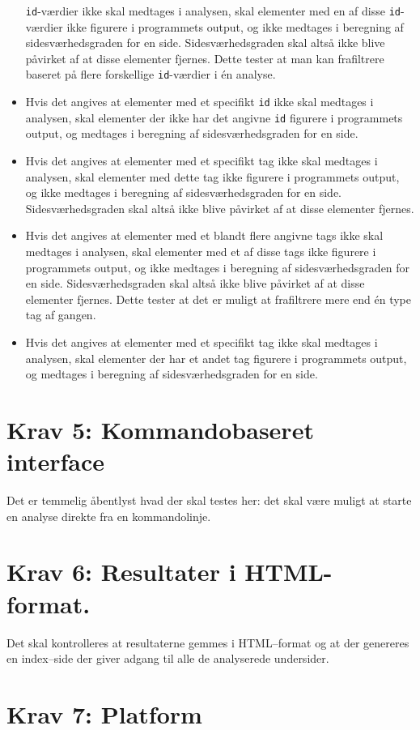 \documentclass[a4paper,oneside,article]{memoir}
\begin{document}
\begin{landscape}
\begin{itemize}
  \texttt{id}-værdier ikke skal medtages i analysen, skal elementer
  med en af disse \texttt{id}-værdier ikke figurere i programmets
  output, og ikke medtages i beregning af sidesværhedsgraden for en
  side. Sidesværhedsgraden skal altså ikke blive påvirket af at disse
  elementer fjernes. Dette tester at man kan frafiltrere baseret på
  flere forskellige \texttt{id}-værdier i én analyse.
\item Hvis det angives at elementer med et specifikt \texttt{id} ikke
  skal medtages i analysen, skal elementer der ikke har det angivne
  \texttt{id} figurere i programmets output, og medtages i beregning
  af sidesværhedsgraden for en side.
\item Hvis det angives at elementer med et specifikt tag ikke skal
  medtages i analysen, skal elementer med dette tag ikke figurere i
  programmets output, og ikke medtages i beregning af
  sidesværhedsgraden for en side. Sidesværhedsgraden skal altså ikke
  blive påvirket af at disse elementer fjernes.
\item Hvis det angives at elementer med et blandt flere angivne tags
  ikke skal medtages i analysen, skal elementer med et af disse tags
  ikke figurere i programmets output, og ikke medtages i beregning af
  sidesværhedsgraden for en side. Sidesværhedsgraden skal altså ikke
  blive påvirket af at disse elementer fjernes. Dette tester at det er
  muligt at frafiltrere mere end én type tag af gangen.
\item Hvis det angives at elementer med et specifikt tag ikke skal
  medtages i analysen, skal elementer der har et andet tag figurere i
  programmets output, og medtages i beregning af sidesværhedsgraden
  for en side.
\end{itemize}

\section{Krav 5: Kommandobaseret interface}
Det er temmelig åbentlyst hvad der skal testes her: det skal være
muligt at starte en analyse direkte fra en kommandolinje.

\section{Krav 6: Resultater i HTML-format.}
Det skal kontrolleres at resultaterne gemmes i HTML--format og at der
genereres en index--side der giver adgang til alle de analyserede
undersider.

\section{Krav 7: Platform}


\end{landscape}
\end{document}
